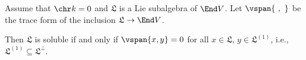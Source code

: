 Assume that $\chr k = 0$ and $\mathfrak{L}$ is a Lie subalgebra of
$\End V$. Let $\vspan{\ ,\ }$ be the trace form of the inclusion
$\mathfrak{L}\to \End V$.

Then $\mathfrak{L}$ is soluble if and only if
$\vspan{x, y} = 0$ for all $x \in \mathfrak{L}$, $y \in \mathfrak{L}^{(1)}$,
i.e., $\mathfrak{L}^{(1)} \subseteq \mathfrak{L}^{\perp}$.
